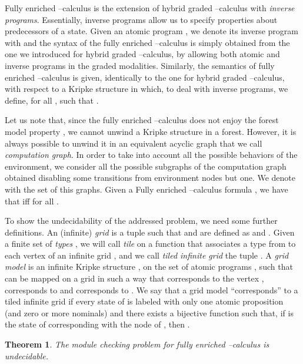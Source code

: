 \documentclass{LMCS}
\theoremstyle{plain}
\newtheorem{theorem}{Theorem}
\begin{document}
Fully enriched --calculus is the extension of hybrid graded
--calculus with \emph{inverse programs}. Essentially, inverse
programs allow us to specify properties about predecessors of a
state. Given an atomic program , we denote its inverse
program with  and the syntax of the fully enriched
--calculus is simply obtained from the one we introduced for
hybrid graded --calculus, by allowing both atomic and inverse
programs in the graded modalities. Similarly, the semantics of
fully enriched --calculus is given, identically to the one
for hybrid graded --calculus, with respect to a Kripke
structure  in which, to deal with inverse
programs, we define, for all ,  such that .

Let us note that, since the fully enriched --calculus does
not enjoy the forest model property \cite{BP04}, we cannot unwind
a Kripke structure in a forest. However, it is always possible to
unwind it in an equivalent acyclic graph that we call
\emph{computation graph}. In order to take into account all the
possible behaviors of the environment, we consider all the
possible subgraphs of the computation graph obtained disabling
some transitions from environment nodes but one. We denote with
 the set of this graphs. Given a Fully enriched
--calculus formula , we have that  iff  for all .

To show the undecidability of the addressed problem, we need some
further definitions. An (infinite) \emph{grid} is a tuple  such that  and  are defined as
 and .
Given a finite set of \emph{types} , we will call \emph{tile}
on  a function  that
associates a type from  to each vertex of an infinite grid ,
and we call \emph{tiled infinite grid} the tuple
. A {\em grid model} is an infinite Kripke
structure , on the set of atomic programs
, such that  can be mapped on a grid in such
a way that  corresponds to the vertex , 
corresponds to  and  corresponds to . We say that a
grid model  ``corresponds'' to a tiled infinite grid
 if every state of  is labeled with only
one atomic proposition (and zero or more nominals) and there
exists a bijective function  such that,
if  is the state of  corresponding with the node
 of , then .

\begin{theorem}\label{the:undecidability}
The module checking problem for fully enriched --calculus is
undecidable.
\end{theorem}
\end{document}
